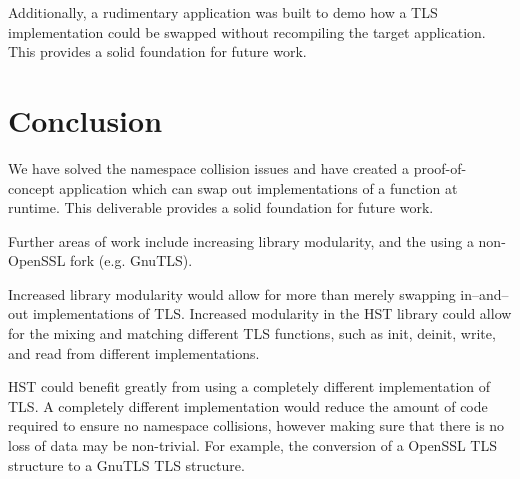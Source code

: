 \documentclass{acm_proc_article-sp}
\begin{document}
Additionally, a rudimentary application was built to demo how a TLS
implementation could be swapped without recompiling the target application. This
provides a solid foundation for future work.

\pagebreak

\section{Conclusion}

We have solved the namespace collision issues and have created a
proof-of-concept application which can swap out implementations of a function at
runtime. This deliverable provides a solid foundation for future work.

Further areas of work include increasing library modularity, and the using a
non-OpenSSL fork (e.g. GnuTLS).

Increased library modularity would allow for more than merely swapping
in--and--out implementations of TLS. Increased modularity in the HST library
could allow for the mixing and matching different TLS functions, such as init,
deinit, write, and read from different implementations.

HST could benefit greatly from using a completely different implementation of
TLS. A completely different implementation would reduce the amount of code
required to ensure no namespace collisions, however making sure that there is no
loss of data may be non-trivial. For example, the conversion of a OpenSSL TLS
structure to a GnuTLS TLS structure.




\balancecolumns
\end{document}
